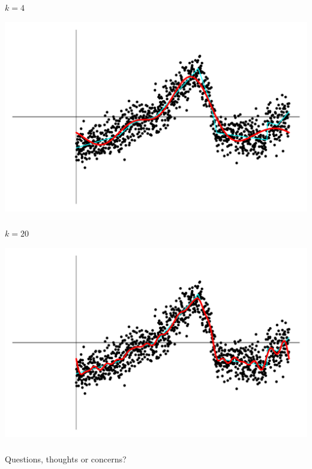 \begin{frame}[fragile] \frametitle{}

$k=4$

\includegraphics[width=\linewidth]{img/fig09.pdf}

\end{frame}

\begin{frame}[fragile] \frametitle{}

$k=20$

\includegraphics[width=\linewidth]{img/fig10.pdf}

\end{frame}

\begin{frame}[fragile] \frametitle{}

{\color{yaleblue}\fontsize{16pt}{20pt}\selectfont Questions, thoughts or concerns?}

\end{frame}
















